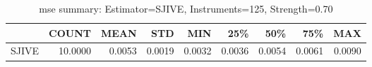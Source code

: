 \begin{table}[ht]
\centering
\caption{mse summary: Estimator=SJIVE, Instruments=125, Strength=0.70}
\begin{tabular}{lrrrrrrrr}
\toprule
 & COUNT & MEAN & STD & MIN & 25\% & 50\% & 75\% & MAX \\
\midrule
SJIVE & 10.0000 & 0.0053 & 0.0019 & 0.0032 & 0.0036 & 0.0054 & 0.0061 & 0.0090 \\
\bottomrule
\end{tabular}
\end{table}
